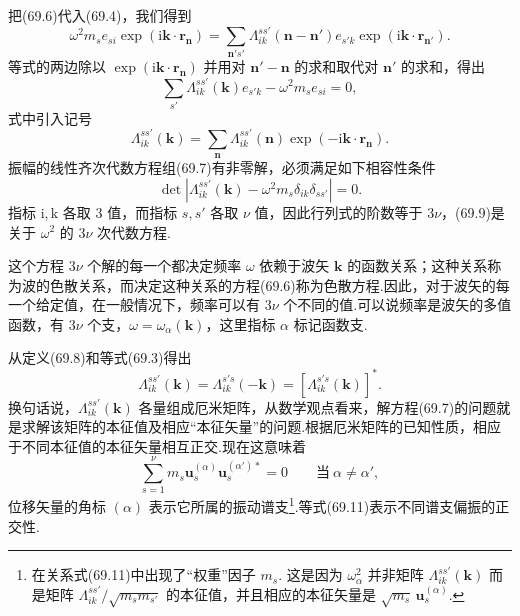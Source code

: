 把(69.6)代入(69.4)，我们得到
\begin{equation*}
  \omega^2m_se_{si}\exp\left(\mathrm{i}\boldsymbol{k}\cdot\boldsymbol{r}_{\boldsymbol{n}}\right)
  =\sum_{\boldsymbol{n}'s'}\Lambda_{ik}^{ss'}\left(\boldsymbol{n}-\boldsymbol{n}'\right)
  e_{s'k}\exp\left(\mathrm{i}\boldsymbol{k}\cdot\boldsymbol{r}_{\boldsymbol{n}'}\right).
\end{equation*}
等式的两边除以 $\exp\left(\mathrm{i}\boldsymbol{k}\cdot\boldsymbol{r}_{\boldsymbol{n}}\right)$ 并用对 $\boldsymbol{n}'-\boldsymbol{n}$ 的求和取代对 $\boldsymbol{n}'$ 的求和，得出
\begin{equation}
  \sum_{s'}\Lambda_{ik}^{ss'}(\boldsymbol{k})e_{s'k}-\omega^2m_se_{si}=0,
\end{equation}
式中引入记号
\begin{equation}
  \Lambda_{ik}^{ss'}(\boldsymbol{k})
  =\sum_{\boldsymbol{n}}\Lambda_{ik}^{ss'}(\boldsymbol{n})\exp\left(-\mathrm{i}\boldsymbol{k}\cdot\boldsymbol{r}_{\boldsymbol{n}}\right).
\end{equation}
振幅的线性齐次代数方程组(69.7)有非零解，必须满足如下相容性条件
\begin{equation}
  \det\left|\Lambda_{ik}^{ss'}(\boldsymbol{k})-\omega^2m_s\delta_{ik}\delta_{ss'}\right|=0.
\end{equation}
指标 i,\,k 各取 3 值，而指标 $s,s'$ 各取 $\nu$ 值，因此行列式的阶数等于 $3\nu$，(69.9)是关于 $\omega^2$ 的 $3\nu$ 次代数方程.

这个方程 $3\nu$ 个解的每一个都决定频率 $\omega$ 依赖于波矢 $\boldsymbol{k}$ 的函数关系；这种关系称为波的色散关系，而决定这种关系的方程(69.6)称为色散方程.因此，对于波矢的每一个给定值，在一般情况下，频率可以有 $3\nu$ 个不同的值.可以说频率是波矢的多值函数，有 $3\nu$ 个支，$\omega=\omega_\alpha(\boldsymbol{k})$，这里指标 $\alpha$ 标记函数支.

从定义(69.8)和等式(69.3)得出
\begin{equation}
  \Lambda_{ik}^{ss'}(\boldsymbol{k})
  =\Lambda_{ik}^{s's}(-\boldsymbol{k})
  =\left[\Lambda_{ik}^{s's}(\boldsymbol{k})\right]^{*}.
\end{equation}
换句话说，$\Lambda_{ik}^{ss'}(\boldsymbol{k})$ 各量组成厄米矩阵，从数学观点看来，解方程(69.7)的问题就是求解该矩阵的本征值及相应“本征矢量”的问题.根据厄米矩阵的已知性质，相应于不同本征值的本征矢量相互正交.现在这意味着
\begin{equation}
  \sum_{s=1}^{\nu}m_s\boldsymbol{u}_s^{(\alpha)}\boldsymbol{u}_s^{(\alpha')*}=0
  \qquad\text{当}\ \alpha\neq\alpha',
\end{equation}
位移矢量的角标 $(\alpha)$ 表示它所属的振动谱支\footnote{在关系式(69.11)中出现了“权重”因子 $m_s$. 这是因为 $\omega_\alpha^2$ 并非矩阵 $\Lambda_{ik}^{ss'}(\boldsymbol{k})$ 而是矩阵 $\Lambda_{ik}^{ss'}/\sqrt{m_s m_{s'}}$ 的本征值，并且相应的本征矢量是 $\sqrt{m_s}\,\boldsymbol{u}_s^{(\alpha)}$.}.等式(69.11)表示不同谱支偏振的正交性.

